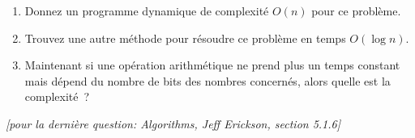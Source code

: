 \documentclass[12pt]{article}
\newcommand{\source}[1]{\begin{flushright}\emph{[#1]}\end{flushright}}
\begin{document}
\begin{center}
\end{center}

\begin{enumerate}
    \item Donnez un programme dynamique de complexité $O(n)$  pour ce problème.
    \item Trouvez une autre méthode pour résoudre ce problème en temps $O(\log n)$.
    \item Maintenant si une opération arithmétique ne prend plus un temps constant mais dépend du nombre de bits des nombres concernés, alors quelle est la complexité~?
\end{enumerate}

\source{pour la dernière question: Algorithms, Jeff Erickson, section 5.1.6}
\end{document}
